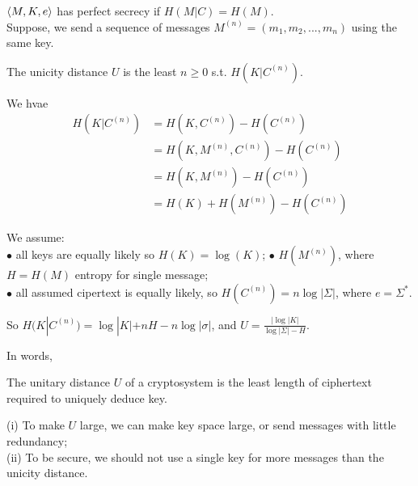 \documentclass[a4paper]{article}
\begin{document}
\begin{rem}
$\langle M,K,e \rangle$ has perfect secrecy if $H(M|C) = H(M)$.\\
Suppose, we send a sequence of messages $M^{(n)} = (m_1,m_2,...,m_n)$ using the same key.
\end{rem}

\begin{defi}
The unicity distance $U$ is the least $n \geq 0$ s.t. $H(K| C^{(n)})$.
\end{defi}

We hvae
\begin{equation*}
\begin{aligned}
H(K|C^{(n)}) &= H(K,C^{(n)}) - H(C^{(n)})\\
&= H(K,M^{(n)},C^{(n)}) - H(C^{(n)})\\
&= H(K,M^{(n)}) - H(C^{(n)})\\
&= H(K) + H(M^{(n)}) - H(C^{(n)})
\end{aligned}
\end{equation*}

We assume:\\
$\bullet$ all keys are equally likely so $H(K) = \log (K)$;
$\bullet$ $H(M^{(n)})$, where $H=H(M)$ entropy for single message;\\
$\bullet$ all assumed cipertext is equally likely, so $H(C^{(n)}) = n \log |\Sigma|$, where $e = \Sigma^*$.

So $H(K|C^{(n)}) = \log |K| + nH - n\log |\sigma|$, and $U =\frac{|\log |K|}{\log |\Sigma|-H}$.

In words,

\begin{defi}
The unitary distance $U$ of a cryptosystem is the least length of ciphertext required to uniquely deduce key.
\end{defi}

\begin{rem}
(i) To make $U$ large, we can make key space large, or send messages with little redundancy;\\
(ii) To be secure, we should not use a single key for more messages than the unicity distance.
\end{rem}

\end{document}
